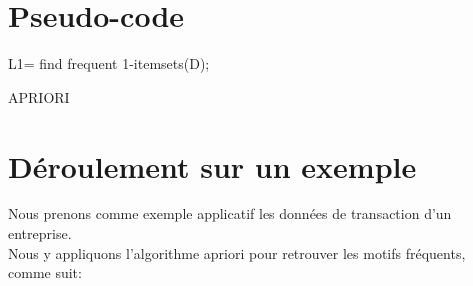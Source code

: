 \documentclass[12pt,a4paper,oneside]{book}
\begin{document}
\newpage

\section{Pseudo-code}



\begin{algorithm}
\DontPrintSemicolon
{}
L1= find frequent 1-itemsets(D);

\;
\caption{{\sc APRIORI}}
\label{algo:duplicate2}
\end{algorithm}

\section{Déroulement sur un exemple}
Nous prenons comme exemple applicatif les données de transaction d'un entreprise.\\
Nous y appliquons l'algorithme apriori pour retrouver les motifs fréquents, comme suit:
\end{document}
